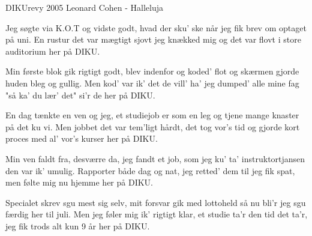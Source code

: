 {DIKUrevy 2005}
{Leonard Cohen - Halleluja}
{
Jeg søgte via K.O.T
og vidste godt, hvad der sku' ske
når jeg fik brev om optaget på uni.
En rustur det var mægtigt sjovt
jeg knækked mig og det var flovt
i store auditorium her på DIKU.


Min første blok gik rigtigt godt,
blev indenfor og koded' flot
og skærmen gjorde huden bleg og gullig. 
Men kod' var ik' det de vill' ha'
jeg dumped' alle mine fag
"så ka' du lær' det" si'r de her på DIKU.


En dag tænkte en ven og jeg,
et studiejob er som en leg
og tjene mange knaster på det ku vi.
Men jobbet det var tem'ligt hårdt,
det tog vor's tid og gjorde kort
proces med al' vor's kurser her på DIKU.



Min ven faldt fra, desværre da,
jeg fandt et job, som jeg ku' ta'
instruktortjansen den var ik' umulig.
Rapporter både dag og nat,
jeg retted' dem til jeg fik spat,
men følte mig nu hjemme her på DIKU.


Specialet skrev sgu mest sig selv,
mit forsvar gik med lottoheld
så nu bli'r jeg sgu færdig her til juli.
Men jeg føler mig ik' rigtigt klar,
et studie ta'r den tid det ta'r,
jeg fik trods alt kun 9 år her på DIKU.

}

